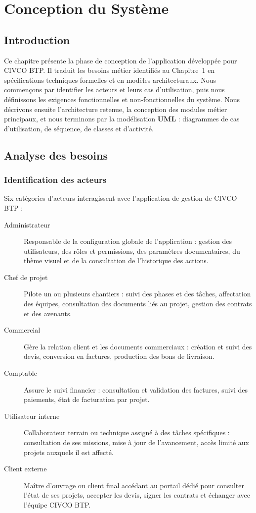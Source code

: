 \chapter{Conception du Système}
\label{chap:conception}

\section{Introduction}

Ce chapitre présente la phase de conception de l'application développée pour CIVCO BTP.
Il traduit les besoins métier identifiés au Chapitre~1 en spécifications techniques
formelles et en modèles architecturaux. Nous commençons par identifier les acteurs et
leurs cas d'utilisation, puis nous définissons les exigences fonctionnelles et
non-fonctionnelles du système. Nous décrivons ensuite l'architecture retenue, la
conception des modules métier principaux, et nous terminons par la modélisation
\textbf{UML} : diagrammes de cas d'utilisation, de séquence, de classes et d'activité.

\section{Analyse des besoins}

\subsection{Identification des acteurs}

Six catégories d'acteurs interagissent avec l'application de gestion de CIVCO BTP :

\begin{description}
  \item[Administrateur] Responsable de la configuration globale de l'application :
  gestion des utilisateurs, des rôles et permissions, des paramètres documentaires,
  du thème visuel et de la consultation de l'historique des actions.
  \item[Chef de projet] Pilote un ou plusieurs chantiers : suivi des phases et des
  tâches, affectation des équipes, consultation des documents liés au projet,
  gestion des contrats et des avenants.
  \item[Commercial] Gère la relation client et les documents commerciaux : création
  et suivi des devis, conversion en factures, production des bons de livraison.
  \item[Comptable] Assure le suivi financier : consultation et validation des
  factures, suivi des paiements, état de facturation par projet.
  \item[Utilisateur interne] Collaborateur terrain ou technique assigné à des tâches
  spécifiques : consultation de ses missions, mise à jour de l'avancement, accès
  limité aux projets auxquels il est affecté.
  \item[Client externe] Maître d'ouvrage ou client final accédant au portail dédié
  pour consulter l'état de ses projets, accepter les devis, signer les contrats et
  échanger avec l'équipe CIVCO BTP.
\end{description}

